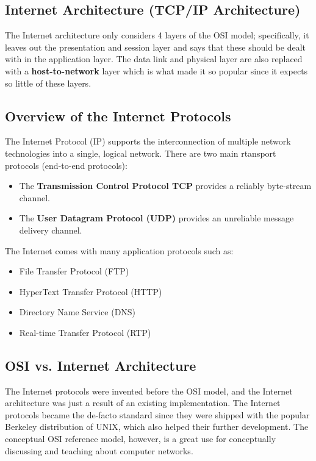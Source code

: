 \documentclass{article}%
\begin{document}
\subsection{Internet Architecture (TCP/IP Architecture)}
\label{sec:orgf072e28}
The Internet architecture only considers 4 layers of the OSI model; specifically, it leaves out the presentation and session layer and says that these should be dealt with in the application layer.
The data link and physical layer are also replaced with a \textbf{host-to-network} layer which is what made it so popular since it expects so little of these layers.

\subsection{Overview of the Internet Protocols}
\label{sec:org36fe112}
The Internet Protocol (IP) supports the interconnection of multiple network technologies into a single, logical network.
There are two main rtansport protocols (end-to-end protocols):
\begin{itemize}
\item The \textbf{Transmission Control Protocol TCP} provides a reliably byte-stream channel.
\item The \textbf{User Datagram Protocol (UDP)} provides an unreliable message delivery channel.
\end{itemize}
The Internet comes with many application protocols such as:
\begin{itemize}
\item File Transfer Protocol (FTP)
\item HyperText Transfer Protocol (HTTP)
\item Directory Name Service (DNS)
\item Real-time Transfer Protocol (RTP)
\end{itemize}

\subsection{OSI vs. Internet Architecture}
\label{sec:org78c91c8}
The Internet protocols were invented before the OSI model, and the Internet architecture was just a result of an existing implementation.
The Internet protocols became the de-facto standard since they were shipped with the popular Berkeley distribution of UNIX, which also helped their further development.
The conceptual OSI reference model, however, is a great use for conceptually discussing and teaching about computer networks.
\end{document}
